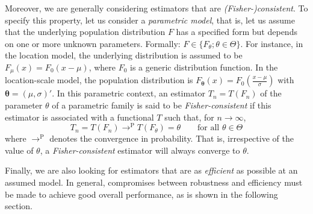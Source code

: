 Moreover, we are generally considering estimators that are
\emph{(Fisher-)consistent}. To specify this property, let us consider a
\emph{parametric model}, that is, let us assume that the underlying
population distribution $F$ has a specified form but depends on one or more
unknown parameters. Formally: $F \in \{F_{\theta}; \theta\in\Theta\}$. For
instance, in the location model, the underlying distribution is assumed to be
$F_\mu(x) = F_0(x - \mu)$, where $F_0$ is a generic
distribution function. In the location-scale model, the population
distribution is $F_{\mathbf{\theta}}(x) = F_0\left(\frac{x-\mu}{\sigma}\right)$ 
with $\mathbf{\theta} = (\mu, \sigma)'$. In this parametric
context, an estimator $T_n = T(F_n)$ of the parameter $\theta$ of a
parametric family is said to be \emph{Fisher-consistent} if this estimator
is associated with a functional $T$ such that, for $n \rightarrow \infty$,      
\[
    T_n = T(F_n) \longrightarrow^\text{P} T(F_{\theta}) = \theta 
    \qquad
    \text{for all $\theta\in\Theta$}
\]
where $\longrightarrow^\text{P}$ denotes the convergence in probability.
That is, irrespective of the value of $\theta$, a \emph{Fisher-consistent} 
estimator will always converge to $\theta$.

Finally, we are also looking for estimators that are as \emph{efficient}
as possible at an assumed model. In general, compromises between robustness and 
efficiency must be made to achieve good overall performance, as is shown in 
the following section.



\endinput
